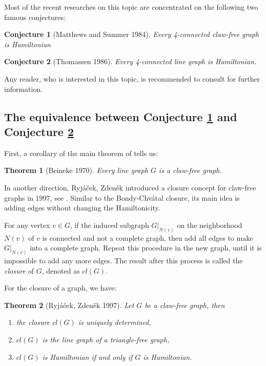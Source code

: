 \documentclass[12pt]{report}
\newtheorem{theorem}{Theorem}
\newtheorem{conjecture}{Conjecture}
\begin{document}
Most of the recent researches on this topic are concentrated on the following two famous conjectures:
\begin{conjecture}[Matthews and Summer 1984]\label{4clf}
Every 4-connected claw-free graph is Hamiltonian
\end{conjecture}


\begin{conjecture}[Thomassen 1986]\label{4lineh}
Every 4-connected line graph is Hamiltonian.
\end{conjecture}

Any reader, who is interested in this topic, is recommended to consult \cite{broersma2012many} for further information. 






\subsection{The equivalence between Conjecture \ref{4clf} and Conjecture \ref{4lineh}}
First, a corollary of the main theorem of \cite{beineke1970characterizations} tells us:

\begin{theorem}[Beineke 1970]\label{2to3}
Every line graph $G$ is a claw-free graph.
\end{theorem}

In another direction, Ryj{\'a}{\v{c}}ek, Zden{\v{e}}k introduced a closure concept for claw-free graphs in 1997, see \cite{ryjavcek1997closure}. Similar to the Bondy-Chv{\'a}tal closure, its main idea is adding edges without changing the Hamiltonicity.

For any vertex $v\in G$, if the induced subgraph $G|_{N(v)}$ on the neighborhood $N(v)$ of $v$ is connected and not a complete graph, then add all edges to make $G|_{N(v)}$ into a complete graph. Repeat this procedure in the new graph, until it is impossible to add any more edges. The result after this process is called the {\em closure} of $G$, denoted as $cl(G)$.

For the closure of a graph, we have:
\begin{theorem}[Ryj{\'a}{\v{c}}ek, Zden{\v{e}}k 1997]\label{3to2}
Let $G$ be a claw-free graph, then
\begin{enumerate}
\item the closure $cl(G)$ is uniquely determined,
\item $cl(G)$ is the line graph of a triangle-free graph,
\item $cl(G)$ is Hamiltonian if and only if $G$ is Hamiltonian.
\end{enumerate}
\end{theorem}
\end{document}
